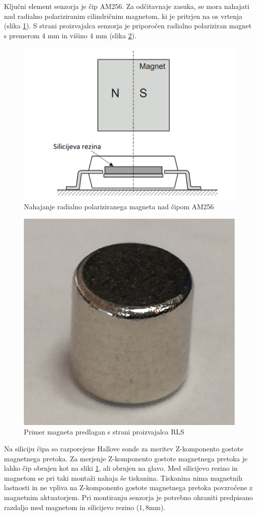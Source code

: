 Ključni element senzorja je čip AM256. Za odčitavnaje zasuka, se mora nahajati nad radialno polariziranim cilindričnim magnetom, ki je pritrjen na os vrtenja (slika \ref{stranski_ris}).
S strani proizvajalca senzorja je priporočen radialno polariziran magnet s premerom 4 mm in višino 4 mm (slika \ref{magnet4mm}).
\begin{figure}[h]
	\centering
	\includegraphics[width=0.5\columnwidth]{./Slike/stranski_ris.png}
	\caption{Nahajanje radialno polariziranega magneta nad čipom AM256 \cite{AM8192}}
	\label{stranski_ris}
\end{figure}
\begin{figure}[h]
	\centering
	\includegraphics[width=0.35\columnwidth]{./Slike/magnet4mm.png}
	\caption{Primer magneta predlagan s strani proizvajalca RLS}
	\label{magnet4mm}
\end{figure}

Na siliciju čipa so razporejene Hallove sonde za meritev Z-komponento gostote magnetnega pretoka. Za merjenje Z-komponento gostote magnetnega pretoka je lahko čip obrnjen kot na sliki \ref{stranski_ris}, ali
obrnjen na glavo. Med silicijevo rezino in magnetom se pri taki montaži nahaja še tiskanina. Tiskanina nima magnetnih lastnosti in ne vpliva na Z-komponento gostote magnetnega pretoka povzročene z magnetnim aktuatorjem. Pri montiranju senzorja je potrebno ohraniti predpisano
razdaljo med magnetom in silicijevo rezino ($1,8 \mathrm{mm}$).




